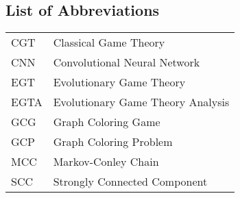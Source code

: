 \subsection*{List of Abbreviations}

\begin{longtable}[l]{l|l}
    CGT  & Classical Game Theory \\
    CNN  & Convolutional Neural Network \\
    EGT  & Evolutionary Game Theory \\
    EGTA & Evolutionary Game Theory Analysis \\
    GCG  & Graph Coloring Game \\
    GCP  & Graph Coloring Problem \\
    MCC  & Markov-Conley Chain \\
    SCC  & Strongly Connected Component \\
\end{longtable}